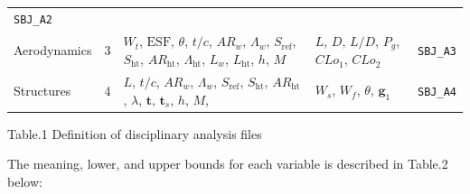 \documentclass[11pt]{article}
\begin{document}
\begin{longtable}[]{@{}lllll@{}}
\begin{minipage}[t]{0.16\columnwidth}
\texttt{SBJ\_A2}\strut
\end{minipage}\tabularnewline
\begin{minipage}[t]{0.07\columnwidth}\raggedright
Aerodynamics\strut
\end{minipage} & \begin{minipage}[t]{0.03\columnwidth}\raggedright
3\strut
\end{minipage} & \begin{minipage}[t]{0.42\columnwidth}\raggedright
\(W_t\), \(\text{ESF}\), \(\theta\), \(t/c\), \(AR_w\), \(\Lambda_w\),
\(S_\text{ref}\), \(S_\text{ht}\), \(AR_\text{ht}\),
\(\Lambda_\text{ht}\), \(L_w\), \(L_\text{ht}\), \(h\), \(M\)\strut
\end{minipage} & \begin{minipage}[t]{0.17\columnwidth}\raggedright
\(L\), \(D\), \(L/D\), \(P_g\), \(CLo_1\), \(CLo_2\)\strut
\end{minipage} & \begin{minipage}[t]{0.16\columnwidth}\raggedright
\texttt{SBJ\_A3}\strut
\end{minipage}\tabularnewline
\begin{minipage}[t]{0.07\columnwidth}\raggedright
Structures\strut
\end{minipage} & \begin{minipage}[t]{0.03\columnwidth}\raggedright
4\strut
\end{minipage} & \begin{minipage}[t]{0.42\columnwidth}\raggedright
\(L\), \(t/c\), \(AR_w\), \(\Lambda_w\), \(S_\text{ref}\),
\(S_\text{ht}\), \(AR_\text{ht}\), \(\lambda\), \(\mathbf{t}\),
\(\mathbf{t}_s\), \(h\), \(M\),\strut
\end{minipage} & \begin{minipage}[t]{0.17\columnwidth}\raggedright
\(W_s\), \(W_f\), \(\theta\), \(\mathbf{g}_1\)\strut
\end{minipage} & \begin{minipage}[t]{0.16\columnwidth}\raggedright
\texttt{SBJ\_A4}\strut
\end{minipage}\tabularnewline
\bottomrule
\end{longtable}

Table.1 Definition of disciplinary analysis files

The meaning, lower, and upper bounds for each variable is described in
Table.2 below:
\end{document}
